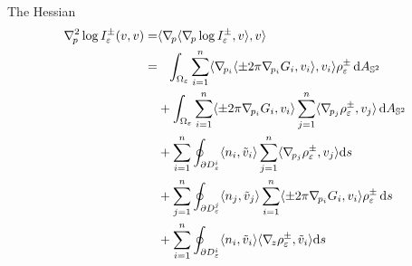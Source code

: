 \documentclass[a4paper]{amsart}
\newcommand{\uS}{\mathbb{S}}
\newcommand{\sph}{{\uS^2}}
\newcommand{\Hess}{\nabla^2}
\newcommand{\dd}{{\rm d}}
\theoremstyle{plain} %
\theoremstyle{definition} %
\theoremstyle{remark}
\begin{document}
The Hessian
\begin{align}
	\Hess_{\! p} \log I^\pm_\varepsilon (v , v)
	=&
	\langle \nabla_{\! p} \langle \nabla_{\! p} \log I^\pm_\varepsilon, v\rangle, v \rangle \nonumber \\
	=&\phantom{+}
	\int_{\Omega_\varepsilon} \sum_{i=1}^n \langle \nabla_{\! p_i} \langle \pm 2\pi \nabla_{\! p_i} G_i, v_i \rangle, v_i \rangle \rho_\varepsilon^\pm \, \dd A_\sph \label{eq:l1}\\
	&+ \int_{\Omega_\varepsilon} \sum_{i=1}^n \langle \pm 2\pi \nabla_{\! p_i} G_i, v_i \rangle \sum_{j=1}^n \langle \nabla_{\! p_j} \rho_\varepsilon^\pm, v_j \rangle \, \dd A_\sph \label{eq:l2}\\
	&+ \sum_{i=1}^n \oint_{\partial D^i_\varepsilon} \langle n_i, \tilde v_i \rangle \sum_{j=1}^n \langle \nabla_{\! p_j} \rho_\varepsilon^\pm, v_j \rangle \dd s \label{eq:l3}\\
	&+ \sum_{j=1}^n \oint_{\partial D^j_\varepsilon} \langle n_j, \tilde v_j \rangle \sum_{i=1}^n \langle \pm 2\pi \nabla_{\! p_i} G_i, v_i \rangle \rho_\varepsilon^\pm \, \dd s \label{eq:l4}\\
	&+ \sum_{i=1}^n \oint_{\partial D^i_\varepsilon} \langle n_i, \tilde v_i \rangle \langle \nabla_{\! z} \rho_\varepsilon^\pm, \tilde v_i \rangle \dd s \nonumber
\end{align}
\end{document}
